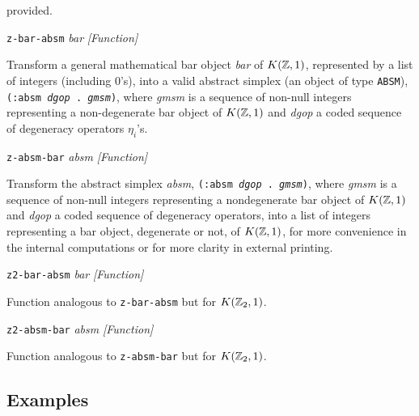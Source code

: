 {{provided. \par}
{\leftskip=5mm
{\tt z-bar-absm} {\em bar}  \hfill {\em [Function]} \par}
{\leftskip=15mm
Transform a general mathematical bar object {\em bar} of $K({\mathbb{Z}}, 1)$,
represented by a list of integers (including $0$'s),
into a valid abstract simplex (an object of type {\tt ABSM}), {\tt (:absm {\em dgop} . {\em gmsm})},
where {\em gmsm}  is a sequence of non-null integers representing a non-de\-ge\-ne\-ra\-te bar object of
$K({\mathbb{Z}},1)$ and {\em dgop} a coded sequence of degeneracy operators $\eta_i$'s. \par}
{\leftskip=5mm
{\tt z-absm-bar} {\em absm}  \hfill {\em [Function]} \par}
{\leftskip=15mm
Transform the abstract simplex {\em absm},  {\tt (:absm {\em dgop} . {\em gmsm})}, where
{\em gmsm} is a sequence of non-null integers representing a nondegenerate bar object of
$K({\mathbb{Z}},1)$ and {\em dgop} a coded sequence of degeneracy operators, into a list of integers
representing a bar object, degenerate or not, of $K({\mathbb{Z}},1)$, for more convenience in the
internal computations or for more clarity in external printing. \par}
{\leftskip=5mm
{\tt z2-bar-absm} {\em bar}  \hfill {\em [Function]} \par}
{\leftskip=15mm
Function analogous to {\tt z-bar-absm} but for  $K({\mathbb{Z}}_2, 1)$. \par}
{\leftskip=5mm
{\tt z2-absm-bar} {\em absm}  \hfill {\em [Function]} \par}
{\leftskip=15mm
Function analogous to {\tt z-absm-bar} but for  $K({\mathbb{Z}}_2, 1)$. \par}
}

\subsection* {Examples}

